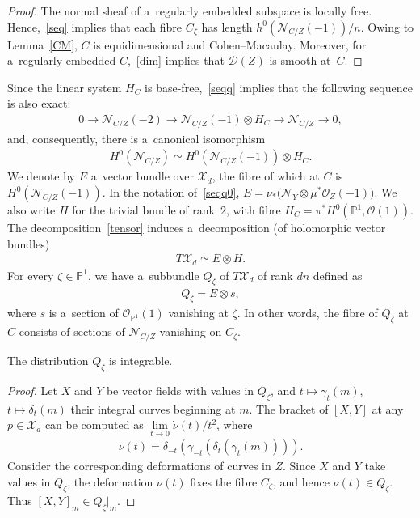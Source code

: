 \begin{proof}
The normal sheaf of a~regularly embedded subspace is locally free.
Hence,~\eqref{seq} implies that each f\/ibre $C_\zeta$ has length $h^0( {\mathcal{N}}_{C/Z}(-1))/n$.
Owing to Lemma~\ref{CM}, $C$ is equidimensional and Cohen--Macaulay.
Moreover, for a~regularly embedded $C$,~\eqref{dim} implies that ${\mathcal{D}}(Z)$ is smooth at~$C$.
\end{proof}

Since the linear system $H_C$ is base-free,~\eqref{seqq} implies that the following sequence is also exact:
\begin{gather*}
0\to {\mathcal{N}}_{C/Z}(-2)\to {\mathcal{N}}_{C/Z}(-1)\otimes H_C\to {\mathcal{N}}_{C/Z}\to 0,
\end{gather*}
and, consequently, there is a~canonical isomorphism
\begin{gather}
H^0({\mathcal{N}}_{C/Z})\simeq H^0({\mathcal{N}}_{C/Z}(-1))\otimes H_C.
\label{tensor}
\end{gather}
We denote by $E$ a~vector bundle over ${\mathcal{X}}_d$, the f\/ibre of which at $C$ is $H^0({\mathcal{N}}_{C/Z}(-1))$.
In the notation of~\eqref{seqq0}, $E= \nu_\ast\bigl({\mathcal{N}}_Y\otimes \mu^\ast{\mathcal{O}}_Z(-1)\bigr)$.
We also write $H$ for the trivial bundle of rank~$2$, with f\/ibre $H_C=\pi^\ast H^0({\mathbb{P}}^1,{\mathcal{O}}(1))$.
The decomposition~\eqref{tensor} induces a~decomposition (of holomorphic vector bundles)
\begin{gather*}
T{\mathcal{X}}_d\simeq E\otimes H.
\end{gather*}
For every $\zeta\in {\mathbb{P}}^1$, we have a~subbundle $Q_\zeta$ of $T{\mathcal{X}}_d$ of rank $dn$ def\/ined as
\begin{gather*}
Q_\zeta=E\otimes s,
\end{gather*}
where $s$ is a~section of ${\mathcal{O}}_{{\mathbb{P}}^1}(1)$ vanishing at $\zeta$.
In other words, the f\/ibre of $Q_\zeta$ at $C$ consists of sections of ${\mathcal{N}}_{C/Z}$ vanishing on $C_\zeta$.

\begin{Proposition}\label{integr}
The distribution $Q_\zeta$ is integrable.
\end{Proposition}

\begin{proof}
Let $X$ and $Y$ be vector f\/ields with values in $Q_\zeta$, and $t\mapsto\gamma_t(m)$, $t\mapsto \delta_t(m)$ their
integral curves beginning at $m$.
The bracket of $[X,Y]$ at any $p\in {\mathcal{X}}_d$ can be computed as $\lim\limits_{t\to 0}\dot\nu(t)/t^2$, where
\begin{gather*}
\nu(t)=\delta_{-t}(\gamma_{-t}(\delta_t(\gamma_t(m)))).
\end{gather*}
Consider the corresponding deformations of curves in $Z$.
Since $X$ and $Y$ take values in $Q_\zeta$, the deformation $\nu(t)$ f\/ixes the f\/ibre $C_\zeta$, and hence $\dot\nu(t)\in
Q_\zeta$.
Thus $[X,Y]_m\in {Q_\zeta}|_m$.
\end{proof}

